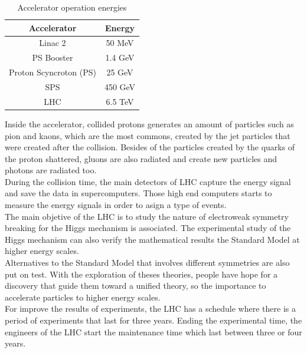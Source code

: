 \begin{linenumbers}
\begin{table}[!htbp]
\centering
	\caption{Accelerator operation energies}
	\begin{tabular}{|c|c|}
		\hline
		Accelerator & Energy \\
		\hline
		Linac 2 &  50 MeV \\
		\hline
		PS Booster & 1.4 GeV \\
		\hline
		Proton Scyncroton (PS) & 25 GeV\\
		\hline
		SPS &  450 GeV\\
		\hline
		LHC & 6.5 TeV\\
		\hline
	\end{tabular}
\end{table}
\pagebreak
Inside the accelerator, collided protons generates an amount of particles such as pion and kaons, which are the most commons, created by the jet particles that were created after the collision. Besides of the particles created by the quarks of the proton shattered, gluons are also radiated and create new particles and photons are radiated too. \\
During the collision time, the main  detectors of LHC capture the energy signal
and save the data in supercomputers. Those high end computers starts to measure the energy signals in order to asign a type of events.
\\

The main objetive of the LHC is to study the nature of electroweak symmetry breaking for the Higgs mechanism is associated. 
The experimental study of the
Higgs mechanism can also  verify the mathematical results  the Standard Model at higher energy scales.\\
Alternatives to the Standard Model that involves different symmetries are also put on test. With the exploration of theses theories, people have hope for a discovery that guide them toward a unified theory, so the importance to accelerate particles to higher energy scales.
\\
For improve the results of experiments, the LHC has a schedule where there is a period of experiments that last for three years. Ending the experimental time, the engineers of the LHC start the maintenance time which last between three or four years.  


\end{linenumbers}

